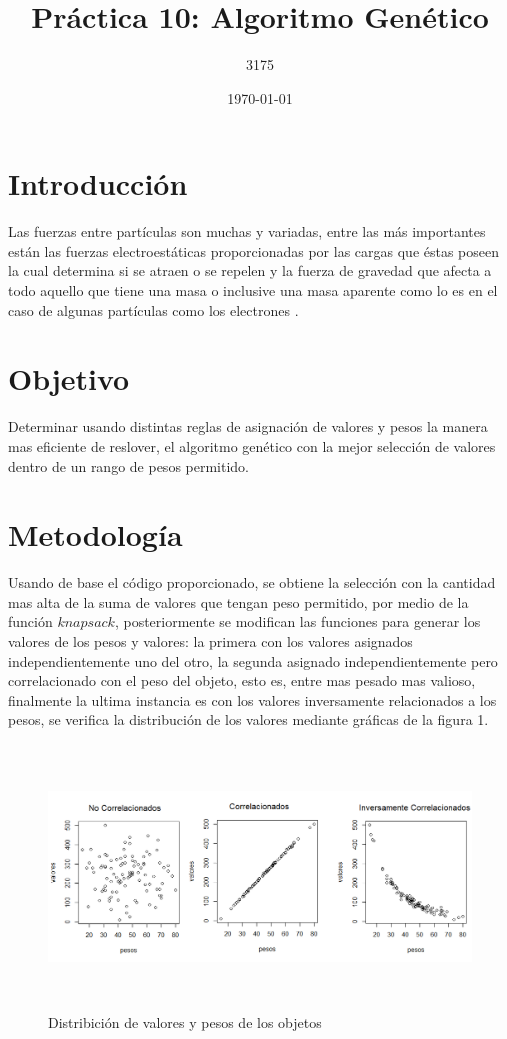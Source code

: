 \documentclass{article}
\author{3175}
\title{Práctica 10: Algoritmo Genético}
\date{\today}
\begin{document}
\maketitle


\section{Introducción}

Las fuerzas entre partículas son muchas y variadas, entre las más importantes están las fuerzas electroestáticas proporcionadas por las cargas que éstas poseen la cual determina si se atraen o se repelen y la fuerza de gravedad que afecta a todo aquello que tiene una masa o inclusive una masa aparente como lo es en el caso de algunas partículas como los electrones \citep{web1}.
 
\section{Objetivo}
Determinar usando distintas reglas de asignación de valores y pesos la manera mas eficiente de reslover, el algoritmo genético con la mejor selección de valores dentro de un rango de pesos permitido.

\section{Metodología}

Usando de base el código proporcionado\citep{webelisa}, se obtiene la selección con la cantidad mas alta de la suma de valores que tengan peso permitido, por medio de la función $knapsack$, posteriormente se modifican las funciones para generar los valores de los pesos y valores: la primera con los valores asignados independientemente uno del otro, la segunda asignado independientemente pero correlacionado con el peso del objeto, esto es, entre mas pesado mas valioso, finalmente la ultima instancia es con los valores inversamente relacionados a los pesos, se verifica la distribución de los valores mediante gráficas de la figura 1.

\begin{figure}[h]
\centering
\includegraphics[width=24cm, height=7cm]{graficas.png}
\caption{Distribición de valores y pesos de los objetos}
\end{figure}
\end{document}
